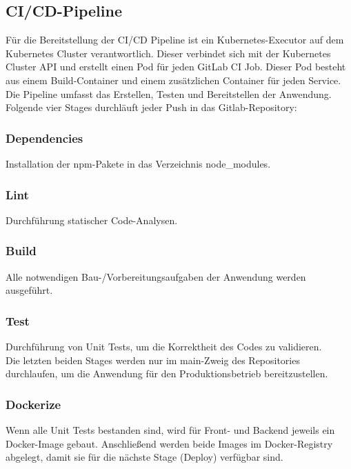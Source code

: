 \documentclass[letterpaper, 10 pt, conference]{ieeeconf}
\begin{document}
\subsection{CI/CD-Pipeline}

Für die Bereitstellung der CI/CD Pipeline ist ein Kubernetes-Executor\cite{c1} auf dem Kubernetes Cluster verantwortlich.  Dieser verbindet sich mit der Kubernetes Cluster API und erstellt einen Pod für jeden GitLab CI Job. Dieser Pod besteht aus einem Build-Container und einem zusätzlichen Container für jeden Service. Die Pipeline umfasst das Erstellen, Testen und Bereitstellen der Anwendung.  Folgende vier Stages durchläuft jeder Push in das Gitlab-Repository:

\subsubsection{Dependencies}

Installation der npm-Pakete in das Verzeichnis node\_modules.

\subsubsection{Lint}

Durchführung statischer Code-Analysen.

\subsubsection{Build}

Alle notwendigen Bau-/Vorbereitungsaufgaben der Anwendung werden ausgeführt.

\subsubsection{Test}

Durchführung von Unit Tests, um die Korrektheit des Codes zu validieren.  \\

Die letzten beiden Stages werden nur im main-Zweig des Repositories durchlaufen, um die Anwendung für den Produktionsbetrieb bereitzustellen.

\subsubsection{Dockerize}

Wenn alle Unit Tests bestanden sind, wird für Front- und Backend jeweils ein Docker-Image gebaut. Anschließend werden beide Images im Docker-Registry abgelegt, damit sie für die nächste Stage (Deploy) verfügbar sind.
\end{document}
